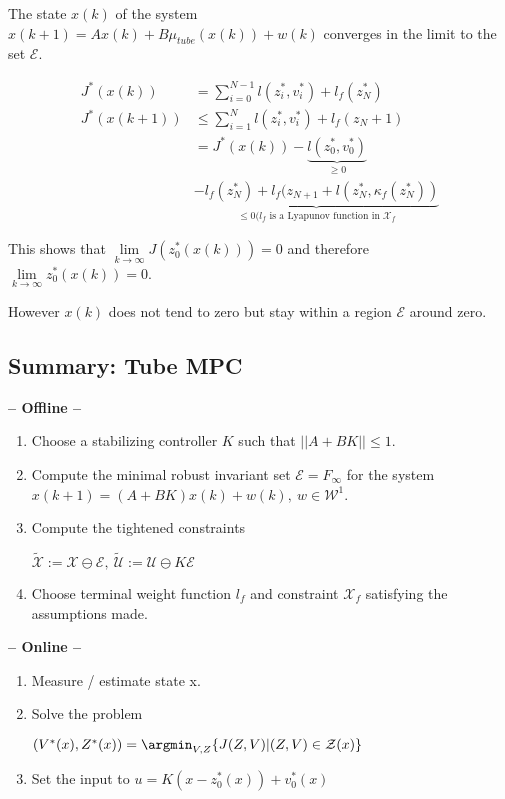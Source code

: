 \documentclass[8pt,a4paper]{scrartcl}
\begin{document}
\begin{multicols*}{3}
The state $x(k)$ of the system $x(k+1)=Ax(k)+B\mu_{tube}(x(k))+w(k)$ converges in the limit to the set $\mathcal{E}$.

\begin{align*}
J^\ast(x(k))&=\sum\limits_{i=0}^{N-1}l(z_i^\ast,v_i^\ast)+l_f(z_N^\ast)\\
J^\ast(x(k+1))&\leq\sum\limits_{i=1}^N l(z^\ast_i,v_i^\ast)+l_f(z_N+1)\\
&=J^\ast(x(k))-\underbrace{l(z_0^\ast,v_0^\ast)}_{\geq 0}\\
&\underbrace{-l_f(z_N^\ast)+l_f(z_{N+1}+l(z_N^\ast,\kappa_f(z_N^\ast))}_{\leq 0\text{($l_f$ is a Lyapunov function in $\mathcal{X}_f$}}
\end{align*}

This shows that $\lim\limits_{k\rightarrow\infty}J(z_0^\ast(x(k)))=0$ and therefore $\lim\limits_{k\rightarrow\infty}z_0^\ast(x(k))=0$.

\finn

However $x(k)$ does not tend to zero but stay within a region $\mathcal{E}$ around zero.

\subsection{Summary: Tube MPC}

\textbf{-- Offline --}
\begin{enumerate}
\ncompaq
\item Choose a stabilizing controller $K$ such that $||A+BK||\leq 1$.
\item Compute the minimal robust invariant set $\mathcal{E}=F_\infty$ for the system $x(k+1)=(A+BK)x(k)+w(k),\ w\in\mathcal{W}^1$.
\item Compute the tightened constraints 

$\tilde{\mathcal{X}}:=\mathcal{X}\ominus\mathcal{E},\ \tilde{\mathcal{U}}:=\mathcal{U}\ominus K\mathcal{E}$
\item Choose terminal weight function $l_f$ and constraint $\mathcal{X}_f$ satisfying the assumptions made.
\end{enumerate}

\textbf{-- Online --}
\begin{enumerate}
\compaq
\item Measure / estimate state x.
\item Solve the problem 

$(V^\ast(x),Z^\ast(x))=\argmin_{V,Z}\{J(Z,V)|(Z,V)\in\mathcal{Z}(x)\}$
\item Set the input to $u=K(x-z_0^\ast(x))+v_0^\ast(x)$
\end{enumerate}


\end{multicols*}
\end{document}
